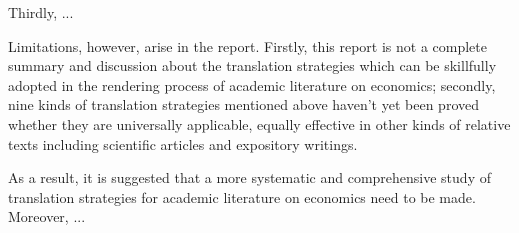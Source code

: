 Thirdly, ...

Limitations, however, arise in the report. Firstly, this report is not a complete summary and discussion about the translation strategies which can be skillfully adopted in the rendering process of academic literature on economics; secondly, nine kinds of translation strategies mentioned above haven’t yet been proved whether they are universally applicable, equally effective in other kinds of relative texts including scientific articles and expository writings.

As a result, it is suggested that a more systematic and comprehensive study of translation strategies for academic literature on economics need to be made. Moreover, ...
